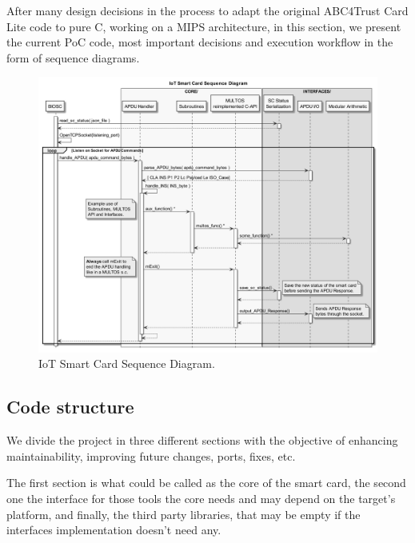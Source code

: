 After many design decisions in the process to adapt the original ABC4Trust Card Lite code to pure C, working on a MIPS architecture, in this section, we present the current \ac{PoC} code, most important decisions and execution workflow in the form of sequence diagrams.



\begin{figure}[bth]
	\begin{center}
		\includegraphics[width=\linewidth]{gfx/UML/sequenceBIOSC}
	\end{center}
	\caption{IoT Smart Card Sequence Diagram.}
	\label{fig:sequenceBIOSC}
\end{figure}




\hfil














\subsection{Code structure}


We divide the project in three different sections with the objective of enhancing maintainability, improving future changes, ports, fixes, etc.

The first section is what could be called as the core of the smart card, the second one the interface for those tools the core needs and may depend on the target's platform, and finally, the third party libraries, that may be empty if the interfaces implementation doesn't need any.




